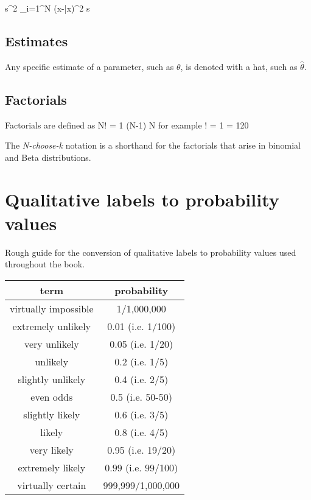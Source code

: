 \beqn
s^{2}\equiv {} \sum_{i=1}^{N} (x-\bar{x})^{2}
\eeqn
{}
\beqn
s\equiv {}
\eeqn

\subsection{Estimates}

Any specific estimate of a parameter, such as $\theta$, is denoted with a hat, such as $\hat{\theta}$.


\subsection{Factorials}

Factorials are defined as
\beqn
N! = 1   \cdots (N-1) \cdot N
\eeqn
for example
! = 1    = 120
\eeqn

The {\em N-choose-k} notation is a shorthand for the factorials that arise in binomial and Beta distributions.

\beqn
{} \equiv {}
\eeqn


\section{Qualitative labels to probability values}

Rough guide for the conversion of qualitative labels to probability values used throughout the book.

\begin{center}
\begin{tabular}{||cc||} \hline\hline
term & probability \\\hline
virtually impossible & 1/1,000,000\\
extremely unlikely & 0.01 (i.e. 1/100) \\
very unlikely & 0.05 (i.e. 1/20) \\
unlikely & 0.2 (i.e. 1/5) \\
slightly unlikely & 0.4 (i.e. 2/5) \\
even odds & 0.5 (i.e. 50-50) \\
slightly likely & 0.6 (i.e. 3/5) \\
likely & 0.8 (i.e. 4/5) \\
very likely & 0.95 (i.e. 19/20) \\
extremely likely & 0.99 (i.e. 99/100) \\
virtually certain & 999,999/1,000,000\\ \hline\hline
\end{tabular}
\end{center}
